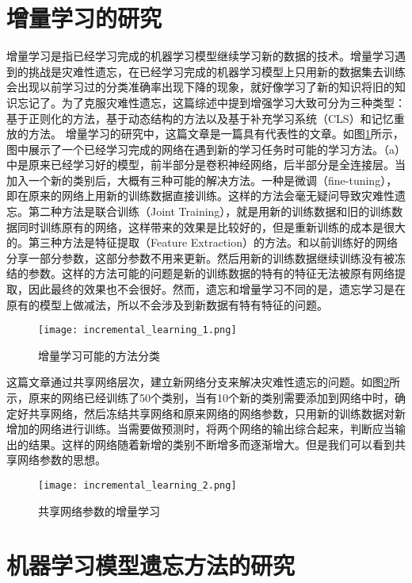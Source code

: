 \section{增量学习的研究}
增量学习\cite{PARISI201954}是指已经学习完成的机器学习模型继续学习新的数据的技术。增量学习遇到的挑战是灾难性遗忘，在已经学习完成的机器学习模型上只用新的数据集去训练会出现以前学习过的分类准确率出现下降的现象，就好像学习了新的知识将旧的知识忘记了。为了克服灾难性遗忘，这篇综述中提到增强学习大致可分为三种类型：基于正则化的方法，基于动态结构的方法以及基于补充学习系统（CLS）和记忆重放的方法。
增量学习的研究中，这篇文章\cite{8107520}是一篇具有代表性的文章。如图\ref{fig:incremental_learning_1}所示，图中展示了一个已经学习完成的网络在遇到新的学习任务时可能的学习方法。（a）中是原来已经学习好的模型，前半部分是卷积神经网络，后半部分是全连接层。当加入一个新的类别后，大概有三种可能的解决方法。一种是微调（fine-tuning），即在原来的网络上用新的训练数据直接训练。这样的方法会毫无疑问导致灾难性遗忘。第二种方法是联合训练（Joint Training），就是用新的训练数据和旧的训练数据同时训练原有的网络，这样带来的效果是比较好的，但是重新训练的成本是很大的。第三种方法是特征提取（Feature Extraction）的方法。和以前训练好的网络分享一部分参数，这部分参数不用来更新。然后用新的训练数据继续训练没有被冻结的参数。这样的方法可能的问题是新的训练数据的特有的特征无法被原有网络提取，因此最终的效果也不会很好。然而，遗忘和增量学习不同的是，遗忘学习是在原有的模型上做减法，所以不会涉及到新数据有特有特征的问题。
\begin{figure}
    \centering
    \texttt{[image: incremental\_learning\_1.png]}
    \caption{增量学习可能的方法分类}
    \label{fig:incremental_learning_1}
\end{figure}
这篇文章\cite{Sarwar_2020}通过共享网络层次，建立新网络分支来解决灾难性遗忘的问题。如图\ref{fig:incremental_learning_2}所示，原来的网络已经训练了50个类别，当有10个新的类别需要添加到网络中时，确定好共享网络，然后冻结共享网络和原来网络的网络参数，只用新的训练数据对新增加的网络进行训练。当需要做预测时，将两个网络的输出综合起来，判断应当输出的结果。这样的网络随着新增的类别不断增多而逐渐增大。但是我们可以看到共享网络参数的思想。
\begin{figure}
    \centering
    \texttt{[image: incremental\_learning\_2.png]}
    \caption{共享网络参数的增量学习}
    \label{fig:incremental_learning_2}
\end{figure}

\section{机器学习模型遗忘方法的研究}
